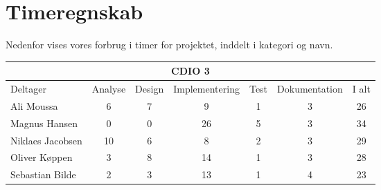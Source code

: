 \chapter*{Timeregnskab}

Nedenfor vises vores forbrug i timer for projektet, inddelt i kategori og navn.

\begin{table}[h]
    \centering
        \begin{tabular}{|l|c|c|c|c|c|c|}
                \hline
            \multicolumn{7}{|c|}{CDIO 3}
            \\ \hline
                    Deltager         &  Analyse  &  Design  &  Implementering  &  Test  &  Dokumentation  &  I alt
            \\ \hline
                    Ali Moussa       &    6      &    7     &        9         &    1   &        3        &    26
            \\ \hline
                    Magnus Hansen    &    0      &    0     &        26         &    5   &        3        &    34
            \\ \hline
                    Niklaes Jacobsen &    10      &    6     &        8         &    2   &        3        &    29
            \\ \hline
                    Oliver Køppen    &    3      &    8     &        14        &    1   &        3        &    28
            \\ \hline
                    Sebastian Bilde  &    2      &    3     &        13         &    1   &        4        &   23
            \\ \hline
        \end{tabular}
\end{table}